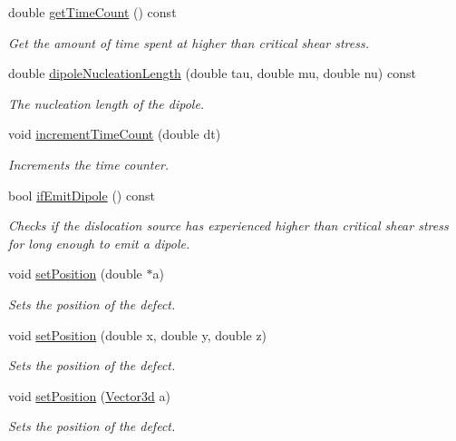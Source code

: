 \begin{DoxyCompactItemize}
double \hyperlink{classDislocationSource_a29889d75659cbf9312e30efd43ea2d7a}{get\-Time\-Count} () const 
\begin{DoxyCompactList}\small\item\em \-Get the amount of time spent at higher than critical shear stress. \end{DoxyCompactList}\item 
double \hyperlink{classDislocationSource_aeaea81924e840cc99ec1844dd72ab807}{dipole\-Nucleation\-Length} (double tau, double mu, double nu) const 
\begin{DoxyCompactList}\small\item\em \-The nucleation length of the dipole. \end{DoxyCompactList}\item 
void \hyperlink{classDislocationSource_a080785e856c308c144d38a8eb0a0e13b}{increment\-Time\-Count} (double dt)
\begin{DoxyCompactList}\small\item\em \-Increments the time counter. \end{DoxyCompactList}\item 
bool \hyperlink{classDislocationSource_afcc06ad0c0152f15cea25317bebd13cb}{if\-Emit\-Dipole} () const 
\begin{DoxyCompactList}\small\item\em \-Checks if the dislocation source has experienced higher than critical shear stress for long enough to emit a dipole. \end{DoxyCompactList}\item 
void \hyperlink{classDefect_a2d233d13a8a93f6fba463a1fbc1c6c9f}{set\-Position} (double $\ast$a)
\begin{DoxyCompactList}\small\item\em \-Sets the position of the defect. \end{DoxyCompactList}\item 
void \hyperlink{classDefect_ad1a6acd8399d2ecabb7ce2b77623bbec}{set\-Position} (double x, double y, double z)
\begin{DoxyCompactList}\small\item\em \-Sets the position of the defect. \end{DoxyCompactList}\item 
void \hyperlink{classDefect_a36ffa9b4b01d38ed8a95ca2c78973cc4}{set\-Position} (\hyperlink{classVector3d}{\-Vector3d} a)
\begin{DoxyCompactList}\small\item\em \-Sets the position of the defect. \end{DoxyCompactList}\item 

\end{DoxyCompactItemize}
